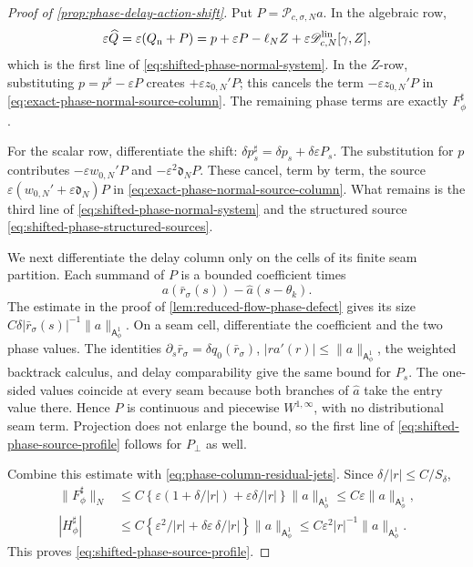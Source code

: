 \begin{proof}[Proof of \cref{prop:phase-delay-action-shift}]
Put \(P=\mathscr P_{c,\sigma,N}a\).  In the algebraic row,
\begin{equation*}
 \varepsilon\widehat Q
 =\varepsilon(Q_{\rm n}+P)
 =p+\varepsilon P-\ell_NZ
      +\varepsilon\mathscr D_{c,N}^{\rm lin}[\gamma,Z],
\end{equation*}
which is the first line of
\cref{eq:shifted-phase-normal-system}.  In the \(Z\)-row, substituting
\(p=p^\sharp-\varepsilon P\) creates
\(+\varepsilon z_{0,N}'P\); this cancels the term
\(-\varepsilon z_{0,N}'P\) in
\cref{eq:exact-phase-normal-source-column}.  The remaining phase terms are
exactly \(F_\phi^\sharp\).

For the scalar row, differentiate the shift:
\(
 \delta p_s^\sharp=\delta p_s
                 +\delta\varepsilon P_s
\).
The substitution for \(p\) contributes
\(-\varepsilon w_{0,N}'P\) and
\(-\varepsilon^2\mathfrak d_NP\).  These cancel, term by term, the source
\(\varepsilon(w_{0,N}'+\varepsilon\mathfrak d_N)P\) in
\cref{eq:exact-phase-normal-source-column}.  What remains is the third
line of \cref{eq:shifted-phase-normal-system} and the structured source
\cref{eq:shifted-phase-structured-sources}.

We next differentiate the delay column only on the cells of its finite seam
partition.  Each summand of \(P\) is a bounded coefficient times
\begin{equation*}
 a(\bar r_\sigma(s))-\widehat a(s-\theta_k).
\end{equation*}
The estimate in the proof of
\cref{lem:reduced-flow-phase-defect} gives its size
\(C\delta|\bar r_\sigma(s)|^{-1}\|a\|_{\mathsf A_\phi^1}\).
On a seam cell, differentiate the coefficient and the two phase values.
The identities
\(\partial_s\bar r_\sigma=\delta q_0(\bar r_\sigma)\),
\(|r a'(r)|\le\|a\|_{\mathsf A_\phi^1}\), the weighted backtrack
calculus, and delay comparability give the same bound for \(P_s\).
The one-sided values coincide at every seam because both branches of
\(\widehat a\) take the entry value there.  Hence \(P\) is continuous and
piecewise \(W^{1,\infty}\), with no distributional seam term.  Projection
does not enlarge the bound, so the first line of
\cref{eq:shifted-phase-source-profile} follows for \(P_\perp\) as well.

Combine this estimate with
\cref{eq:phase-column-residual-jets}.  Since
\(\delta/|r|\le C/S_\delta\),
\begin{align*}
 \|F_\phi^\sharp\|_N
 &\le C\left\{\varepsilon(1+\delta/|r|)
                    +\varepsilon\delta/|r|\right\}
      \|a\|_{\mathsf A_\phi^1}
 \le C\varepsilon\|a\|_{\mathsf A_\phi^1},\\
 |H_\phi^\sharp|
 &\le C\left\{\varepsilon^2/|r|
                   +\delta\varepsilon\,\delta/|r|\right\}
      \|a\|_{\mathsf A_\phi^1}
 \le C\varepsilon^2|r|^{-1}
      \|a\|_{\mathsf A_\phi^1}.
\end{align*}
This proves \cref{eq:shifted-phase-source-profile}.


\end{proof}

